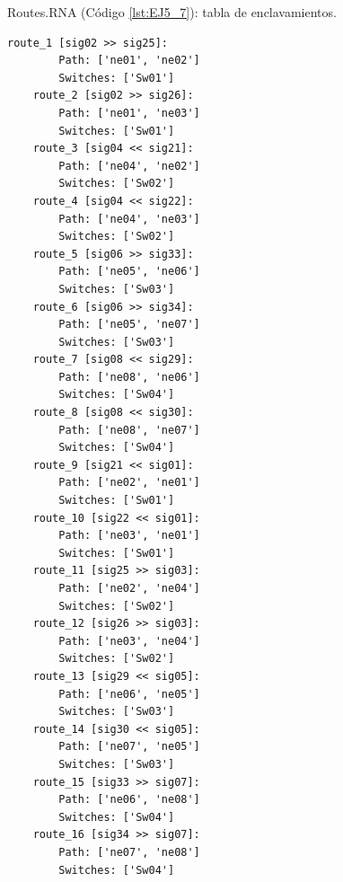	Routes.RNA (Código \ref{lst:EJ5_7}): tabla de enclavamientos.
	
	\begin{lstlisting}[language = {}, caption = Routes.RNA, label = {lst:EJ5_7}]
	route_1 [sig02 >> sig25]:
		Path: ['ne01', 'ne02']
		Switches: ['Sw01']
	route_2 [sig02 >> sig26]:
		Path: ['ne01', 'ne03']
		Switches: ['Sw01']
	route_3 [sig04 << sig21]:
		Path: ['ne04', 'ne02']
		Switches: ['Sw02']
	route_4 [sig04 << sig22]:
		Path: ['ne04', 'ne03']
		Switches: ['Sw02']
	route_5 [sig06 >> sig33]:
		Path: ['ne05', 'ne06']
		Switches: ['Sw03']
	route_6 [sig06 >> sig34]:
		Path: ['ne05', 'ne07']
		Switches: ['Sw03']
	route_7 [sig08 << sig29]:
		Path: ['ne08', 'ne06']
		Switches: ['Sw04']
	route_8 [sig08 << sig30]:
		Path: ['ne08', 'ne07']
		Switches: ['Sw04']
	route_9 [sig21 << sig01]:
		Path: ['ne02', 'ne01']
		Switches: ['Sw01']
	route_10 [sig22 << sig01]:
		Path: ['ne03', 'ne01']
		Switches: ['Sw01']
	route_11 [sig25 >> sig03]:
		Path: ['ne02', 'ne04']
		Switches: ['Sw02']
	route_12 [sig26 >> sig03]:
		Path: ['ne03', 'ne04']
		Switches: ['Sw02']
	route_13 [sig29 << sig05]:
		Path: ['ne06', 'ne05']
		Switches: ['Sw03']
	route_14 [sig30 << sig05]:
		Path: ['ne07', 'ne05']
		Switches: ['Sw03']
	route_15 [sig33 >> sig07]:
		Path: ['ne06', 'ne08']
		Switches: ['Sw04']
	route_16 [sig34 >> sig07]:
		Path: ['ne07', 'ne08']
		Switches: ['Sw04']
	\end{lstlisting}